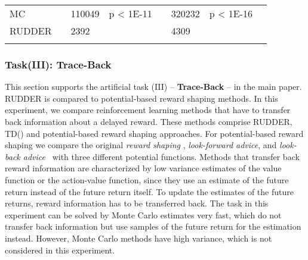 \documentclass{article}
\begin{document}
\begin{appendices}
\begin{landscape}
\begin{table}[htp]
\begin{flushleft}
\begin{tabular}{*{1}{>{\raggedright}p{14em}}*{1}{>{\columncolor{mColor1}\raggedleft}p{4em}}*{1}{>{\columncolor{mColor1}\raggedleft}p{5em}}*{1}{>{\columncolor{mColor1}\raggedright}p{5em}}*{1}{>{\raggedleft}p{4em}}*{1}{>{\raggedleft}p{5em}}*{1}{>{\raggedright}p{5em}}*{1}{>{\raggedright}p{0.01em}}}
\toprule[1pt]
\addlinespace[2pt]
{\bf Method} &\multicolumn{3}{c}{\bf Delay 100} &\multicolumn{3}{c}{\bf Delay 500} &\\
\toprule[1pt]
MC & 119568 & {\small  110049} & {\small p < 1E-11} & 345533 & {\small  320232} & {\small p < 1E-16} &  \\
RUDDER & 4147 & {\small  2392} &  & 5769 & {\small  4309} &  &  \\
\addlinespace[1pt]
\end{tabular}
\end{flushleft}
\end{table}

\end{landscape}


\newpage








\subsubsection{Task(III): Trace-Back}
This section supports the artificial task (III) -- {\bf Trace-Back} -- in the main paper.
RUDDER is compared to potential-based reward shaping methods.
In this experiment, we compare reinforcement learning methods that
have to transfer back information about a delayed reward.
These methods comprise RUDDER, TD() and potential-based reward shaping approaches.
For potential-based reward shaping we compare the original 
{\em reward shaping} \cite{Ng:99}, {\em look-forward advice}, 
and {\em look-back advice}~\cite{Wiewiora:03}
with three different potential functions.
Methods that transfer back reward information
are characterized by low variance estimates
of the value function or the action-value function, 
since they use an estimate of the future return instead of the
future return itself.
To update the estimates of the future returns, 
reward information has to be transferred back.
The task in this experiment can be solved by Monte Carlo
estimates very fast, which do not transfer back information but use samples of 
the future return for the estimation instead. 
However, Monte Carlo methods have high variance, which is
not considered in this experiment. 

\end{appendices}
\end{document}
